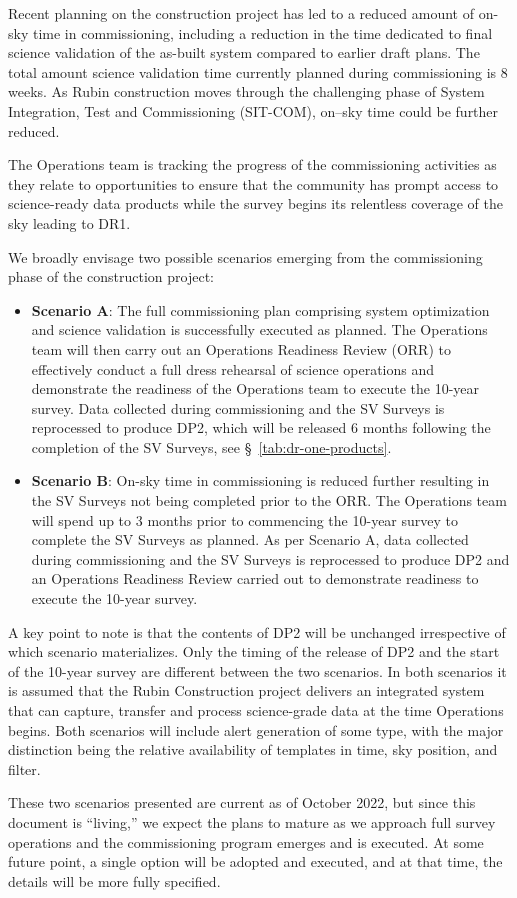 Recent planning on the construction project has led to a reduced amount of on-sky time in commissioning, including a reduction in the time dedicated to final science validation of the as-built system compared to earlier draft plans.
The total amount science validation time currently planned during commissioning is 8 weeks. 
As Rubin construction moves through the challenging phase of System Integration, Test and Commissioning (SIT-COM), on--sky time could be further reduced.

The Operations team is tracking the progress of the commissioning activities as they relate to \es opportunities to ensure that the community has prompt access to science-ready data products while the survey begins its relentless coverage of the sky leading to DR1.

We broadly envisage two possible scenarios emerging from the commissioning phase of the construction project: 

\begin{itemize}
\item \textbf{Scenario A}:
The full commissioning plan comprising system optimization and science validation is successfully executed as planned. 
The Operations team will then carry out an Operations Readiness Review (ORR) to effectively conduct a full dress rehearsal of science operations and demonstrate the readiness of the Operations team to execute the 10-year survey. 
Data collected during commissioning and the SV Surveys is reprocessed to produce DP2, which will be released 6 months following the completion of the SV Surveys, see \S~\ref{tab:dr-one-products}.

\item \textbf{Scenario B}:
On-sky time in commissioning is reduced further resulting in the SV Surveys not being completed prior to the ORR. 
The Operations team will spend up to 3 months prior to commencing the 10-year survey to complete the SV Surveys as planned. 
As per Scenario A, data collected during commissioning and the SV Surveys is reprocessed to produce DP2 and an Operations Readiness Review carried out to demonstrate readiness to execute the 10-year survey. 

\end{itemize}

A key point to note is that the contents of DP2 will be unchanged irrespective of which scenario materializes.  
Only the timing of the release of DP2 and the start of the 10-year survey are different between the two scenarios. 
In both scenarios it is assumed that the Rubin Construction project delivers an integrated system that can capture, transfer and process science-grade data at the time Operations begins.
Both scenarios will include alert generation of some type, with the major distinction being the relative availability of templates in time, sky position, and filter.


These two scenarios presented are current as of October 2022, but since this document is ``living,'' we expect the plans to mature as we approach full survey operations and the commissioning program emerges and is executed.
At some future point, a single option will be adopted and executed, and at that time, the details will be more fully specified.
